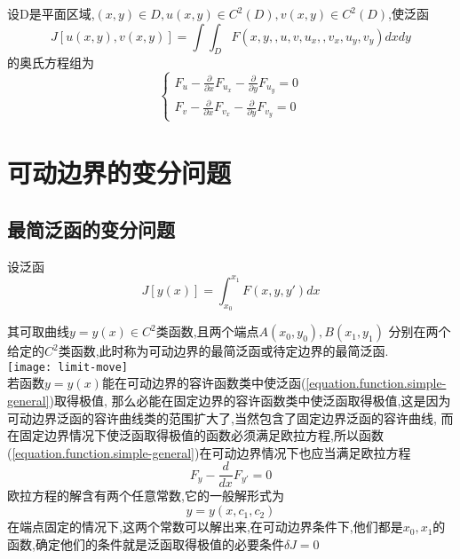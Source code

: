 \documentclass{book}
\begin{document}
\begin{corollary}
设D是平面区域,$(x,y) \in D ,u(x,y) \in C^2(D),v(x,y) \in C^2(D)$,使泛函
$$ J[u(x,y),v(x,y)]=\int\int_{D}F(x,y,,u,v,u_x,,v_x,u_y,v_y)dxdy $$
的奥氏方程组为
$$
\left\{
  \begin{array}{ll}
   F_u -\frac{\partial}{\partial x}F_{u_x}-\frac{\partial}{\partial y}F_{u_y} = 0 \\
   F_v -\frac{\partial}{\partial x}F_{v_x}-\frac{\partial}{\partial y}F_{v_y} = 0
  \end{array}
\right.
$$
\end{corollary}

\section{可动边界的变分问题}
\subsection{最简泛函的变分问题}
设泛函
\begin{equation}
J[y(x)]=\int_{x_0}^{x_1}F(x,y,y')dx
\label{equation.function.simple-general}
\end{equation}

其可取曲线$y = y(x) \in C^2$类函数,且两个端点$A(x_0,y_0),B(x_1,y_1)$ 分别在两个给定的$C^2$类函数,此时称为可动边界的最简泛函或待定边界的最简泛函.\\

\texttt{[image: limit-move]}\\

若函数$y=y(x)$能在可动边界的容许函数类中使泛函(\ref{equation.function.simple-general})取得极值,
那么必能在固定边界的容许函数类中使泛函取得极值,这是因为可动边界泛函的容许曲线类的范围扩大了,当然包含了固定边界泛函的容许曲线,
而在固定边界情况下使泛函取得极值的函数必须满足欧拉方程,所以函数(\ref{equation.function.simple-general})在可动边界情况下也应当满足欧拉方程
$$ F_y - \frac{d}{dx}F_{y'} =0 $$
欧拉方程的解含有两个任意常数,它的一般解形式为
$$y=y(x,c_1,c_2)$$
在端点固定的情况下,这两个常数可以解出来,在可动边界条件下,他们都是$x_0,x_1$的函数,确定他们的条件就是泛函取得极值的必要条件$\delta J=0$
\end{document}

